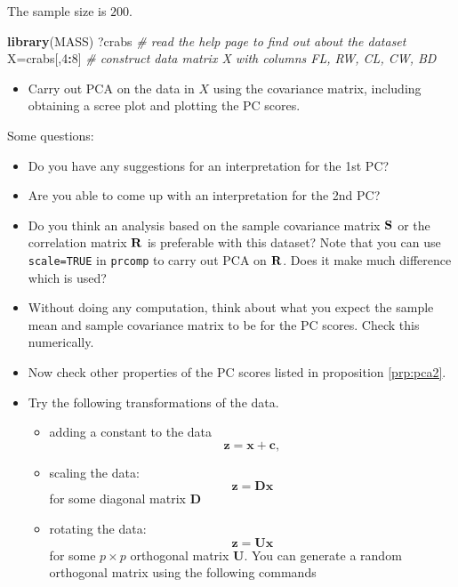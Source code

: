 \documentclass[]{book}
\newenvironment{Shaded}{\begin{snugshade}}{\end{snugshade}}
\newcommand{\CommentTok}[1]{\textcolor[rgb]{0.56,0.35,0.01}{\textit{#1}}}
\newcommand{\DecValTok}[1]{\textcolor[rgb]{0.00,0.00,0.81}{#1}}
\newcommand{\KeywordTok}[1]{\textcolor[rgb]{0.13,0.29,0.53}{\textbf{#1}}}
\newcommand{\NormalTok}[1]{#1}
\newcommand{\OperatorTok}[1]{\textcolor[rgb]{0.81,0.36,0.00}{\textbf{#1}}}
\providecommand{\tightlist}{%
  \setlength{\itemsep}{0pt}\setlength{\parskip}{0pt}}
\theoremstyle{definition}
\theoremstyle{definition}
\theoremstyle{definition}
\theoremstyle{remark}
\begin{document}
The sample size is \(200\).

\begin{Shaded}
\begin{Highlighting}[]
\KeywordTok{library}\NormalTok{(MASS)}
\NormalTok{?crabs }\CommentTok{# read the help page to find out about the dataset}
\NormalTok{X=crabs[,}\DecValTok{4}\OperatorTok{:}\DecValTok{8}\NormalTok{]     }\CommentTok{# construct data matrix X with columns FL, RW, CL, CW, BD}
\end{Highlighting}
\end{Shaded}

\begin{itemize}
\tightlist
\item
  Carry out PCA on the data in \(X\) using the covariance matrix, including obtaining a scree plot and plotting the PC scores.
\end{itemize}

Some questions:

\begin{itemize}
\item
  Do you have any suggestions for an interpretation for the 1st PC?
\item
  Are you able to come up with an interpretation for the 2nd PC?
\item
  Do you think an analysis based on the sample covariance matrix \({\bf S}\) or the
  correlation matrix \({\bf R}\) is preferable with this dataset? Note that you can use \texttt{scale=TRUE} in \texttt{prcomp}
  to carry out PCA on \({\bf R}\). Does it make much difference which is used?
\item
  Without doing any computation, think about what you expect the sample mean and sample covariance matrix to be for the PC scores. Check this numerically.
\item
  Now check other properties of the PC scores listed in proposition \ref{prp:pca2}.
\item
  Try the following transformations of the data.

  \begin{itemize}
  \item
    adding a constant to the data
    \[\mathbf z= \mathbf x+\mathbf c,\]
  \item
    scaling the data:
    \[\mathbf z= \mathbf D\mathbf x\]
    for some diagonal matrix \(\mathbf D\)
  \item
    rotating the data:
    \[\mathbf z= \mathbf U\mathbf x\]
    for some \(p\times p\) orthogonal matrix \(\mathbf U\).
    You can generate a random orthogonal matrix using the following commands
  \end{itemize}
\end{itemize}
\end{document}
